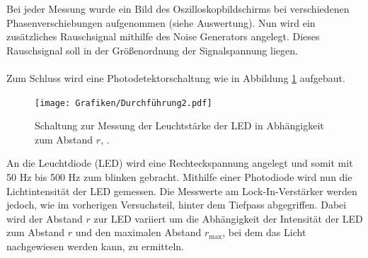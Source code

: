 Bei jeder Messung wurde ein Bild des Oszilloskopbildschirms bei verschiedenen Phasenverschiebungen aufgenommen (siehe Auswertung).
\newpage
Nun wird ein zusätzliches Rauschsignal mithilfe des Noise Generators angelegt. Dieses Rauschsignal soll in der Größenordnung der Signalspannung liegen. 
\\
\\
Zum Schluss wird eine Photodetektorschaltung wie in Abbildung \ref{fig:Aufbau2} aufgebaut. 
\begin{figure}[H]
  \centering
  \texttt{[image: Grafiken/Durchführung2.pdf]}
  \caption{Schaltung zur Messung der Leuchtstärke der LED in Abhängigkeit zum Abstand $r$, \cite{1}.}
  \label{fig:Aufbau2}
\end{figure}
An die Leuchtdiode (LED) wird eine Rechteckspannung angelegt und somit mit 50 Hz bis 500 Hz zum blinken gebracht. 
Mithilfe einer Photodiode wird nun die Lichtintensität der LED gemessen. 
Die Messwerte am Lock-In-Verstärker werden jedoch, wie im vorherigen Versuchsteil, hinter dem Tiefpass abgegriffen.
Dabei wird der Abstand $r$ zur LED variiert um die Abhängigkeit der Intensität der LED zum Abstand $r$ und den maximalen Abstand $r_\text{max}$, bei dem das Licht nachgewiesen werden kann, zu ermitteln.